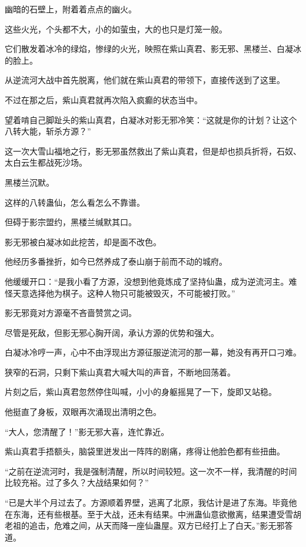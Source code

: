 
\begin{this_body}

幽暗的石壁上，附着着点点的幽火。

这些火光，个头都不大，小的如萤虫，大的也只是灯笼一般。

它们散发着冰冷的绿焰，惨绿的火光，映照在紫山真君、影无邪、黑楼兰、白凝冰的脸上。

从逆流河大战中首先脱离，他们就在紫山真君的带领下，直接传送到了这里。

不过在那之后，紫山真君就再次陷入疯癫的状态当中。

望着啃自己脚趾头的紫山真君，白凝冰对影无邪冷笑：“这就是你的计划？让这个八转大能，斩杀方源？”

这一次大雪山福地之行，影无邪虽然救出了紫山真君，但是却也损兵折将，石奴、太白云生都战死沙场。

黑楼兰沉默。

这样的八转蛊仙，怎么看怎么不靠谱。

但碍于影宗盟约，黑楼兰缄默其口。

影无邪被白凝冰如此挖苦，却是面不改色。

他经历多番挫折，如今已然养成了泰山崩于前而不动的城府。

他缓缓开口：“是我小看了方源，没想到他竟炼成了坚持仙蛊，成为逆流河主。难怪天意选择他为棋子。这种人物只可能被毁灭，不可能被打败。”

影无邪竟对方源毫不吝啬赞赏之词。

尽管是死敌，但影无邪心胸开阔，承认方源的优势和强大。

白凝冰冷哼一声，心中不由浮现出方源征服逆流河的那一幕，她没有再开口刁难。

狭窄的石洞，只剩下紫山真君大喊大叫的声音，不断地回荡着。

片刻之后，紫山真君忽然停住叫喊，小小的身躯摇晃了一下，旋即又站稳。

他挺直了身板，双眼再次涌现出清明之色。

“大人，您清醒了！”影无邪大喜，连忙靠近。

紫山真君手捂额头，脑袋里迸发出一阵阵的剧痛，疼得让他脸色都有些扭曲。

“之前在逆流河时，我是强制清醒，所以时间较短。这一次不一样，我清醒的时间比较充裕。过了多久？大战结果如何？”

“已是大半个月过去了。方源顺着界壁，逃离了北原，我估计是进了东海。毕竟他在东海，还有些根基。至于大战，还未有结果。中洲蛊仙意欲撤离，结果遭受雪胡老祖的追击，危难之间，从天而降一座仙蛊屋。双方已经打上了白天。”影无邪答道。


\end{this_body}

